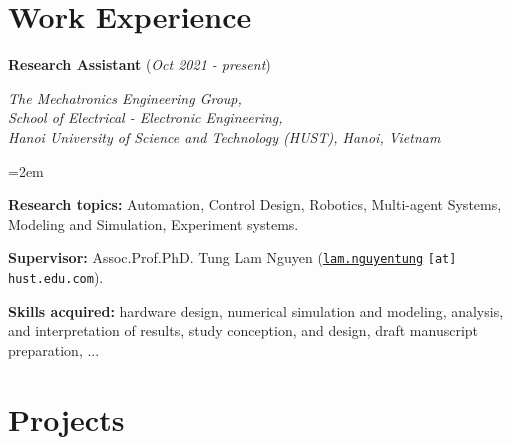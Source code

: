 \documentclass[10pt]{article}
\let\oldhref\href
\renewcommand{\href}[2]{\oldhref{#1}{\ul{#2}}}
\newcommand{\work}[4]{%
	\noindent \textbf{#1} (\textit{#2})\par
	\vspace{0.5em}
	\noindent \textit{#3}\par
	\vspace{0.5em}
	\noindent\hangindent=2em\hangafter=0 #4 \par\normalsize
}
\begin{document}
	
	
	\section*{Work Experience}
	
	\work{Research Assistant}
	{Oct 2021 - present}
	{The Mechatronics Engineering Group, \\School of Electrical - Electronic Engineering,\\Hanoi University of Science and Technology (HUST), Hanoi, Vietnam}
	{ \begin{soloitemize}
			\item \textbf{Research topics:} Automation, Control Design, Robotics, Multi-agent Systems, Modeling and Simulation, Experiment systems.
			\item \textbf{Supervisor:} Assoc.Prof.PhD. Tung Lam Nguyen
			({\href{mailto:lam.nguyentung@hust.edu.vn}{\texttt{lam.nguyentung}}}
			\texttt{[at] hust.edu.com}).
			\item \textbf{Skills acquired:}  hardware design, numerical simulation and modeling, analysis, and interpretation of results, study conception, and design, draft manuscript preparation, ...
		\end{soloitemize}
	}
	


	\section*{Projects}
	
\end{document}
